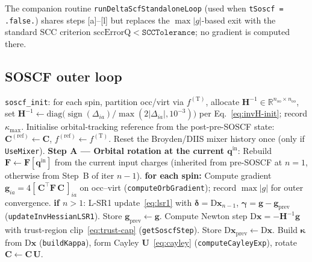 \documentclass[11pt,a4paper]{article}
\newcommand{\kkappa}{\bm{\kappa}}
\newcommand{\xx}{\mathbf{x}}
\newcommand{\gg}{\mathbf{g}}
\newcommand{\HH}{\mathbf{H}}
\newcommand{\FF}{\mathbf{F}}
\newcommand{\CC}{\mathbf{C}}
\newcommand{\UU}{\mathbf{U}}
\newcommand{\qq}{\mathbf{q}}
\begin{document}
The companion routine \texttt{runDeltaScfStandaloneLoop} (used when
\texttt{tSoscf = .false.}) shares steps [a]--[l] but replaces the
$\max|g|$-based exit with the standard SCC criterion
$\mathrm{sccErrorQ}<\mathtt{SCCTolerance}$; no gradient is computed
there.

\subsection{SOSCF outer loop}
\label{sec:algo-soscf}

\begin{algorithm}[H]
\caption{\texttt{runSoscfLoop} (main.F90:8339). One Broyden/DIIS charge
update \emph{and} one quasi-Newton orbital rotation per outer
iteration; no inner diagonalisation.}
\label{alg:soscf}
\begin{algorithmic}[1]
\State \texttt{soscf\_init}: for each spin, partition occ/virt via
       $f^{(\mathrm{T})}$, allocate
       $\HH^{-1}\in\mathbb{R}^{n_\mathrm{oo}\times n_\mathrm{oo}}$, set
       $\HH^{-1} \gets \mathrm{diag}\big(\operatorname{sign}(\Delta_{ia})/\max(2|\Delta_{ia}|,10^{-3})\big)$
       per Eq.~\eqref{eq:invH-init}; record $\kappa_\mathrm{max}$.
\State Initialise orbital-tracking reference from the post-pre-SOSCF state:
       $\CC^{(\mathrm{ref})}\gets\CC$, $f^{(\mathrm{ref})}\gets f^{(\mathrm{T})}$.
\State Reset the Broyden/DIIS mixer history once (only if \texttt{UseMixer}).
  \State \textbf{Step A --- Orbital rotation at the current $\qq^\mathrm{in}$}:
  \State \qquad Rebuild $\FF\gets\FF[\qq^\mathrm{in}]$ from the current input charges (inherited from pre-SOSCF at $n=1$, otherwise from Step~B of iter $n{-}1$).
  \State \qquad \textbf{for each spin:}
  \State \qquad\qquad Compute gradient $\gg_{ia}=4[\,\CC^{\top}\FF\,\CC\,]_{ia}$ on occ--virt (\texttt{computeOrbGradient}); record $\max|g|$ for outer convergence.
  \State \qquad\qquad \textbf{if $n>1$}: L-SR1 update~\eqref{eq:lsr1} with $\bm{\delta}=\mathrm{D}\xx_{n-1}$, $\bm{\gamma}=\gg-\gg_{\mathrm{prev}}$ (\texttt{updateInvHessianLSR1}).
  \State \qquad\qquad Store $\gg_\mathrm{prev}\gets\gg$. Compute Newton step $\mathrm{D}\xx=-\HH^{-1}\gg$ with trust-region clip~\eqref{eq:trust-cap} (\texttt{getSoscfStep}).
  \State \qquad\qquad Store $\mathrm{D}\xx_\mathrm{prev}\gets\mathrm{D}\xx$. Build $\kkappa$ from $\mathrm{D}\xx$ (\texttt{buildKappa}), form Cayley $\UU$~\eqref{eq:cayley} (\texttt{computeCayleyExp}), rotate $\CC\gets\CC\,\UU$.

\end{algorithmic}
\end{algorithm}
\end{document}
